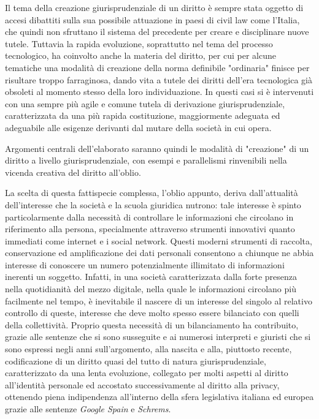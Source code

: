 Il tema della creazione giurisprudenziale di un diritto è sempre stata oggetto di accesi dibattiti sulla sua possibile attuazione in paesi di civil law come l'Italia, che quindi non sfruttano il sistema del precedente per creare e disciplinare nuove tutele. Tuttavia la rapida evoluzione, soprattutto nel tema del processo tecnologico, ha coinvolto anche la materia del diritto, per cui per alcune tematiche una modalità di creazione della norma definibile "ordinaria" finisce per risultare troppo farraginosa, dando vita a tutele dei diritti dell'era tecnologica già obsoleti al momento stesso della loro individuazione. In questi casi si è intervenuti con una sempre più agile e comune tutela di derivazione giurisprudenziale, caratterizzata da una più rapida costituzione, maggiormente adeguata ed adeguabile alle esigenze derivanti dal mutare della società in cui opera.

Argomenti centrali dell'elaborato saranno quindi le modalità di "creazione" di un diritto a livello giurisprudenziale, con esempi e parallelismi rinvenibili nella vicenda creativa del diritto all'oblio.

La scelta di questa fattispecie complessa, l'oblio appunto, deriva dall'attualità dell'interesse che la società e la scuola giuridica nutrono: tale interesse è spinto particolarmente dalla necessità di controllare le informazioni che circolano in riferimento alla persona, specialmente attraverso strumenti innovativi quanto immediati come internet e i social network.
Questi moderni strumenti di raccolta, conservazione ed amplificazione dei dati personali consentono a chiunque ne abbia interesse di conoscere un numero potenzialmente illimitato di informazioni inerenti un soggetto.
Infatti, in una società caratterizzata dalla forte presenza nella quotidianità del mezzo digitale, nella quale le informazioni circolano più facilmente nel tempo, è inevitabile il nascere di un interesse del singolo al relativo controllo di queste, interesse che deve molto spesso essere bilanciato con quelli della collettività.
Proprio questa necessità di un bilanciamento ha contribuito, grazie alle sentenze che si sono susseguite e ai numerosi interpreti e giuristi che si sono espressi negli anni sull'argomento, alla nascita e alla, piuttosto recente, codificazione di un diritto quasi del tutto di natura giurisprudenziale, caratterizzato da una lenta evoluzione, collegato per molti aspetti al diritto all'identità personale ed accostato successivamente al diritto alla privacy, ottenendo piena indipendenza all'interno della sfera legislativa italiana ed europea grazie alle sentenze \textit{Google Spain} e \textit{Schrems}.

